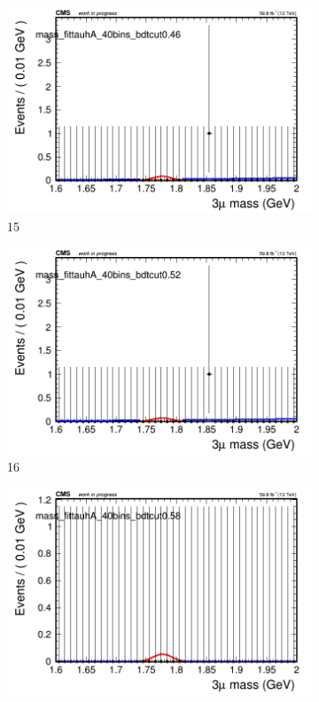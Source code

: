 \begin{figure}[h!]
\begin{subfigure}{0.2\textwidth}
        \includegraphics[width=\textwidth]{unfixed_exp/plots/tauhA/massfit_tauhA_40bins_bdtcut0.46.png}
        \caption{15}
    \end{subfigure}
    \begin{subfigure}{0.2\textwidth}
        \includegraphics[width=\textwidth]{unfixed_exp/plots/tauhA/massfit_tauhA_40bins_bdtcut0.52.png}
        \caption{16}
    \end{subfigure}
    \begin{subfigure}{0.2\textwidth}
        \includegraphics[width=\textwidth]{unfixed_exp/plots/tauhA/massfit_tauhA_40bins_bdtcut0.58.png}

\end{subfigure}
\end{figure}
